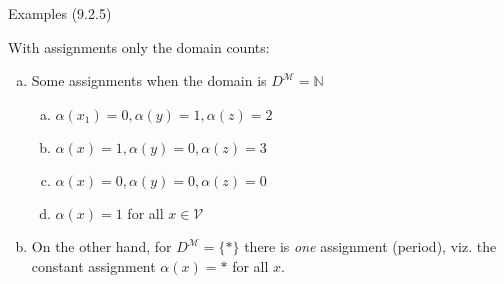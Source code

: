 \begin{frame}{Examples (9.2.5)}

With assignments only the domain counts:

\bigskip

			\begin{enumerate}[(a)]
			\itemsep=16pt
		
			\item Some assignments when the domain is $D^\mathcal{M}=\mathbb{N}$
			
				\begin{enumerate}[(a)]
				
					\item $\alpha(x_1)=0, \alpha(y)=1, \alpha(z)=2$
					
					\item $\alpha(x)=1, \alpha(y)=0, \alpha(z)=3$
					
					\item $\alpha(x)=0, \alpha(y)=0, \alpha(z)=0$
					
					\item $\alpha(x)=1$ for all $x\in\mathcal{V}$
									
				\end{enumerate}
				
			\item On the other hand, for $D^\mathcal{M}=\{\ast\}$ there is \emph{one} assignment (period), viz. the constant assignment $\alpha(x)=\ast$ for all $x$.

		\end{enumerate}

\end{frame}


